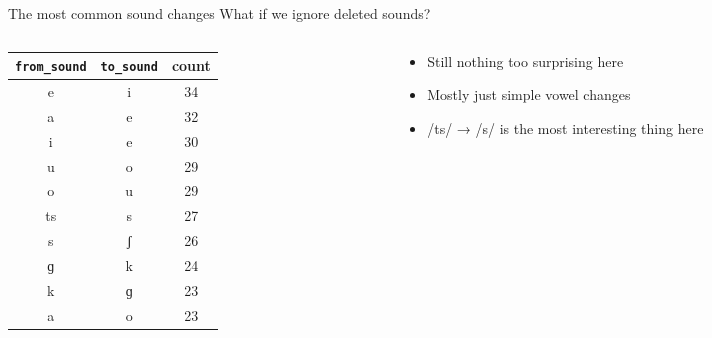 \documentclass[10pt]{beamer}
\begin{document}
  \begin{frame}[fragile=singleslide]{The most common sound changes}
    What if we ignore deleted sounds? 
    \begin{columns}[c]
      \begin{column}{0.5\textwidth}
        \begin{table}
          \begin{center}
            \begin{tabular}{|c|c|c|}
              \hline
              \small \verb|from_sound| & \small \verb|to_sound| & \small \textbf{count} \\
              \hline
              e &  i &  34 \\
              a &  e &  32 \\
              i &  e &  30 \\
              u &  o &  29 \\
              o &  u &  29 \\
              ts & s &  27 \\
              s &  ʃ &  26 \\
              ɡ &  k &  24 \\
              k &  ɡ &  23 \\
              a &  o &  23 \\
              \hline
            \end{tabular}
          \end{center}
        \end{table}
      \end{column}
      \begin{column}{0.5\textwidth}
        \begin{itemize}
          \item Still nothing too surprising here
          \item Mostly just simple vowel changes
          \item /ts/ → /s/ is the most interesting thing here
        \end{itemize}
      \end{column}
    \end{columns}
  \end{frame}
\end{document}
